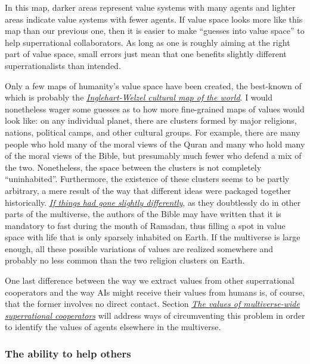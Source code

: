 In this map, darker areas represent value systems with many agents and
lighter areas indicate value systems with fewer agents. If value space
looks more like this map than our previous one, then it is easier to
make ``guesses into value space'' to help superrational collaborators.
As long as one is roughly aiming at the right part of value space, small
errors just mean that one benefits slightly different superrationalists
than intended.

Only a few maps of humanity's value space have been created, the
best-known of which is probably the
\href{https://en.wikipedia.org/wiki/Inglehart\%E2\%80\%93Welzel_cultural_map_of_the_world}{\emph{Inglehart-Welzel
cultural map of the world}}. I would nonetheless wager some guesses as
to how more fine-grained maps of values would look like: on any
individual planet, there are clusters formed by major religions,
nations, political camps, and other cultural groups. For example, there
are many people who hold many of the moral views of the Quran and many
who hold many of the moral views of the Bible, but presumably much fewer
who defend a mix of the two. Nonetheless, the space between the clusters
is not completely ``uninhabited''. Furthermore, the existence of these
clusters seems to be partly arbitrary, a mere result of the way that
different ideas were packaged together historically.
\href{https://en.wikipedia.org/wiki/Path_dependence}{\emph{If things had
gone slightly differently}}, as they doubtlessly do in other parts of
the multiverse, the authors of the Bible may have written that it is
mandatory to fast during the month of Ramadan, thus filling a spot in
value space with life that is only sparsely inhabited on Earth. If the
multiverse is large enough, all these possible variations of values are
realized somewhere and probably no less common than the two religion
clusters on Earth.

One last difference between the way we extract values from other
superrational cooperators and the way AIs might receive their values
from humans is, of course, that the former involves no direct contact.
Section \protect\hyperlink{_sm02dccw7h9m}{\emph{The values of
multiverse-wide superrational cooperators}} will address ways of
circumventing this problem in order to identify the values of agents
elsewhere in the multiverse.

\subsubsection{The ability to help
others}\label{the-ability-to-help-others}

